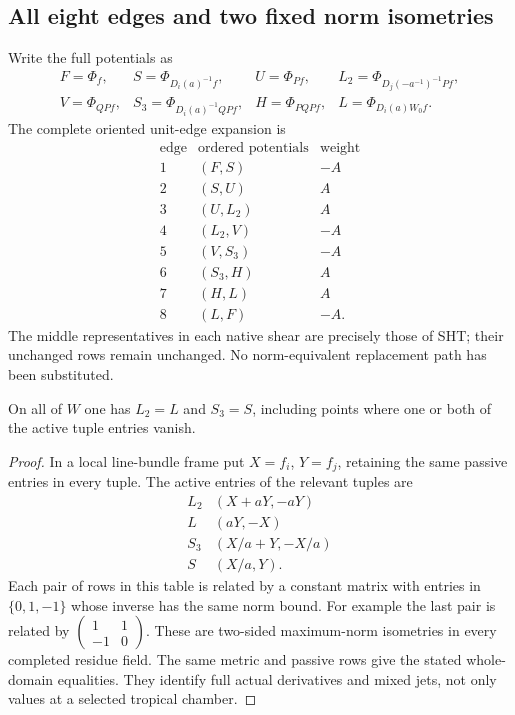 \subsection{All eight edges and two fixed norm isometries}

Write the full potentials as
\[
 \begin{array}{llll}
 F=\Phi_f,& S=\Phi_{D_i(a)^{-1}f},& U=\Phi_{Pf},
    & L_2=\Phi_{D_j(-a^{-1})^{-1}Pf},\\
 V=\Phi_{QPf},& S_3=\Phi_{D_i(a)^{-1}QPf},
    &H=\Phi_{PQPf},& L=\Phi_{D_i(a)W_0f}.
 \end{array}
 \tag{WNR4}
\]
The complete oriented unit-edge expansion is
\[
\begin{array}{c|c|c}
 \text{edge}&\text{ordered potentials}&\text{weight}\\\hline
 1&(F,S)&-A\\
 2&(S,U)&A\\
 3&(U,L_2)&A\\
 4&(L_2,V)&-A\\
 5&(V,S_3)&-A\\
 6&(S_3,H)&A\\
 7&(H,L)&A\\
 8&(L,F)&-A.
\end{array}
\tag{WNR5}
\]
The middle representatives in each native shear are precisely those
of SHT; their unchanged rows remain unchanged.  No norm-equivalent
replacement path has been substituted.

\begin{lemma}
On all of $W$ one has $L_2=L$ and $S_3=S$, including points where
one or both of the active tuple entries vanish.
\end{lemma}

\begin{proof}
In a local line-bundle frame put $X=f_i$, $Y=f_j$, retaining the
same passive entries in every tuple.  The active entries of the
relevant tuples are
\[
 \begin{array}{c|c}
 L_2&(X+aY,-aY)\\
 L&(aY,-X)\\
 S_3&(X/a+Y,-X/a)\\
 S&(X/a,Y).
 \end{array}
 \tag{WNR6}
\]
Each pair of rows in this table is related by a constant matrix
with entries in $\{0,1,-1\}$ whose inverse has the same norm bound.
For example the last pair is related by
$\left(\begin{smallmatrix}1&1\\-1&0\end{smallmatrix}\right)$.
These are two-sided maximum-norm isometries in every completed
residue field.  The same metric and passive rows give the stated
whole-domain equalities.  They identify full actual derivatives and
mixed jets, not only values at a selected tropical chamber.
\end{proof}


